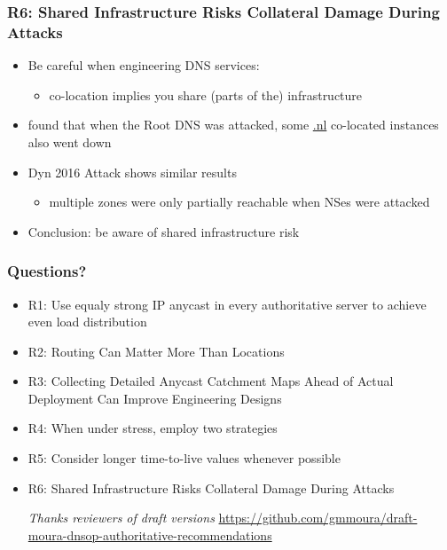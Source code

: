 \documentclass[11pt,show 
notes,notheorems,noamsthm,blank]{beamer} %
\begin{document}
\begin{frame}
 \frametitle{R6:  Shared Infrastructure Risks Collateral Damage During 
Attacks}
 \begin{itemize}
  \item Be careful when engineering DNS services:
  
  \begin{itemize}
   \item  co-location implies you share (parts of the) infrastructure
  \end{itemize}


\item \cite{Moura16b} found that when the Root DNS was attacked, some \url{.nl}
co-located instances also went down
\item Dyn 2016 Attack shows similar results
\begin{itemize}
 \item multiple zones were only partially reachable 
when NSes were attacked
\end{itemize}


\item Conclusion: be aware of shared infrastructure risk
 \end{itemize}

\end{frame}




\begin{frame}
 \frametitle{Questions?}

 \begin{itemize}
  \item R1: Use equaly strong IP anycast in every authoritative server to
    achieve even load distribution~\cite{Mueller17b}
    
  \item R2:  Routing Can Matter More Than Locations~\cite{Schmidt17a}
  
  \item R3: Collecting Detailed Anycast Catchment Maps Ahead of Actual
    Deployment Can Improve Engineering Designs~\cite{Vries17b}
    
  \item R4:    When under stress, employ two strategies~\cite{Moura16b}
  
  \item R5:  Consider longer time-to-live values whenever 
possible~\cite{Moura18b}
  
    \item R6:  Shared Infrastructure Risks Collateral Damage During 
Attacks~\cite{Moura16b}
    
 \vspace{1cm}
 \centering \textit{Thanks  reviewers of draft versions}
 \centering \small 
\url{https://github.com/gmmoura/draft-moura-dnsop-authoritative-recommendations}
  

 \end{itemize}

\end{frame}
\end{document}
